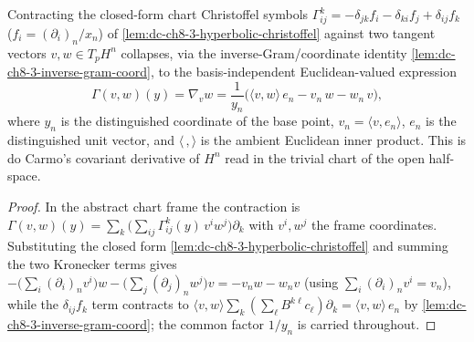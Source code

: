 \begin{lemma}
  \label{lem:dc-ch8-3-christoffel-contraction}
  \leanok
  Contracting the closed-form chart Christoffel symbols
  $\Gamma^k_{ij}=-\delta_{jk}f_i-\delta_{ki}f_j+\delta_{ij}f_k$
  ($f_i=(\partial_i)_n/x_n$) of \cref{lem:dc-ch8-3-hyperbolic-christoffel} against
  two tangent vectors $v,w\in T_pH^n$ collapses, via the inverse-Gram/coordinate
  identity \cref{lem:dc-ch8-3-inverse-gram-coord}, to the basis-independent
  Euclidean-valued expression
  $$
  \Gamma(v,w)(y)=\nabla_v w
    =\frac{1}{y_n}\Big(\langle v,w\rangle\, e_n-v_n\,w-w_n\,v\Big),
  $$
  where $y_n$ is the distinguished coordinate of the base point, $v_n=\langle v,e_n\rangle$,
  $e_n$ is the distinguished unit vector, and $\langle\,,\rangle$ is the ambient
  Euclidean inner product. This is do Carmo's covariant derivative of $H^n$ read in
  the trivial chart of the open half-space.
\end{lemma}
\begin{proof}
  \leanok
  In the abstract chart frame the contraction is
  $\Gamma(v,w)(y)=\sum_k\big(\sum_{ij}\Gamma^k_{ij}(y)\,v^i w^j\big)\partial_k$ with
  $v^i,w^j$ the frame coordinates. Substituting the closed form
  \cref{lem:dc-ch8-3-hyperbolic-christoffel} and summing the two Kronecker terms
  gives $-\big(\sum_i (\partial_i)_n v^i\big)w-\big(\sum_j(\partial_j)_n w^j\big)v
  =-v_n w-w_n v$ (using $\sum_i(\partial_i)_n v^i=v_n$), while the $\delta_{ij}f_k$
  term contracts to $\langle v,w\rangle\sum_k(\sum_\ell B^{k\ell}c_\ell)\partial_k
  =\langle v,w\rangle\,e_n$ by \cref{lem:dc-ch8-3-inverse-gram-coord}; the common
  factor $1/y_n$ is carried throughout.
\end{proof}

